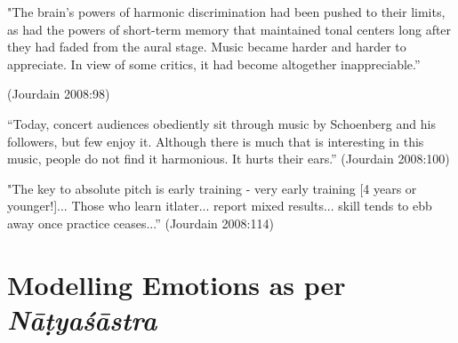 \begin{myquote}
 "The brain’s powers of harmonic discrimination had been pushed to their limits, as had the powers of short-term memory that maintained tonal centers long after they had faded from the aural stage. Music became harder and harder to appreciate. In view of some critics, it had become altogether inappreciable.” 

\hfill (Jourdain 2008:98)

“Today, concert audiences obediently sit through music by Schoenberg and his followers, but few enjoy it. Although there is much that is interesting in this music, people do not find it harmonious. It hurts their ears.”
\hfill (Jourdain 2008:100)

"The key to absolute pitch is early training - very early training [4 years or younger!]... Those who learn itlater... report mixed results... skill tends to ebb away once practice ceases...”
\hfill (Jourdain 2008:114)
\end{myquote}

\section*{Modelling Emotions as per \textsl{Nāṭyaśāstra}}

